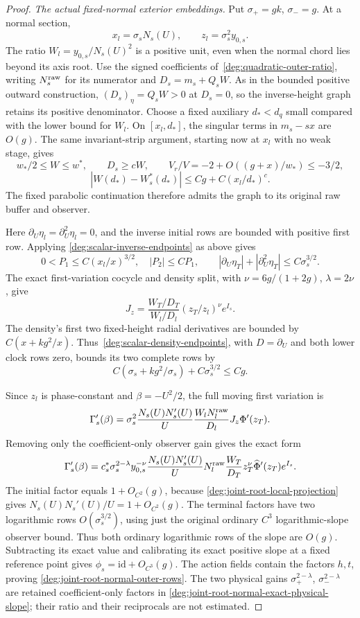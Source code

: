 \begin{proof}
\emph{The actual fixed-normal exterior embeddings.}
Put \(\sigma_+=gk\), \(\sigma_-=g\). At a normal section,
\[
 x_l=\sigma_sN_s(U),\qquad z_l=\sigma_s^2y_{0,s}.
\]
The ratio \(W_l=y_{0,s}/N_s(U)^2\) is a positive unit, even
when the normal chord lies beyond its axis root.
Use the signed coefficients of~\eqref{deg:quadratic-outer-ratio},
writing \(N_s^{\rm raw}\) for its numerator and \(D_s=m_s+Q_sW\).
As in the bounded positive outward construction,
\((D_s)_\eta=Q_sW>0\) at \(D_s=0\), so the inverse-height
graph retains its positive denominator.
Choose a fixed auxiliary \(d_*<d_q\) small compared with the lower
bound for \(W_l\). On \([x_l,d_*]\), the singular terms in
\(m_s-sx\) are \(O(g)\). The same invariant-strip argument, starting
now at \(x_l\) with no weak stage, gives
\[
 w_*/2\le W\le w^*,\qquad D_s\ge cW,\qquad
 V_r/V=-2+O((g+x)/w_*)\le-3/2,
\]
\[
 |W(d_*)-W_s^*(d_*)|\le Cg+C(x_l/d_*)^c .
\]
The fixed parabolic continuation therefore admits the graph to its
original raw buffer and observer.

Here \(\partial_U\eta_l=\partial_U^2\eta_l=0\), and the inverse
initial rows are bounded with positive first row. Applying
\eqref{deg:scalar-inverse-endpoints} as above gives
\[
 0<P_1\le C(x_l/x)^{3/2},\quad |P_2|\le CP_1,\qquad
 |\partial_U\eta_T|+|\partial_U^2\eta_T|\le C\sigma_s^{3/2}.
\]
The exact first-variation cocycle and density split, with
\(\nu=6g/(1+2g)\), \(\lambda=2\nu\), give
\[
 J_z=\frac{W_T/D_T}{W_l/D_l}(z_T/z_l)^\nu e^{I_s}.
\]
The density's first two fixed-height radial derivatives are bounded
by \(C(x+kg^2/x)\). Thus~\eqref{deg:scalar-density-endpoints},
with \(D=\partial_U\) and both lower clock rows zero, bounds its two
complete rows by
\[
 C(\sigma_s+kg^2/\sigma_s)+C\sigma_s^{3/2}\le Cg.
\]

Since \(z_l\) is phase-constant and \(\beta=-U^2/2\), the full
moving first variation is
\[
 \Gamma_s'(\beta)=
 \sigma_s^2\frac{N_s(U)N_s'(U)}U
 \frac{W_lN_l^{\rm raw}}{D_l}J_z\Phi'(z_T).
\]
Removing only the coefficient-only observer gain gives the exact
form
\begin{equation}
 \Gamma_s'(\beta)=
 c_s^\ast\sigma_s^{2-\lambda}y_{0,s}^{-\nu}
 \frac{N_s(U)N_s'(U)}U N_l^{\rm raw}
 \frac{W_T}{D_T}z_T^\nu\widehat\Phi'(z_T)e^{I_s}.
 \label{deg:joint-root-normal-exact-physical-slope}
\end{equation}
The initial factor equals \(1+O_{C^2}(g)\), because
\eqref{deg:joint-root-local-projection} gives
\(N_s(U)N_s'(U)/U=1+O_{C^2}(g)\).
The terminal factors have two logarithmic rows
\(O(\sigma_s^{3/2})\), using just the original ordinary \(C^3\)
logarithmic-slope observer bound. Thus both ordinary logarithmic
rows of the slope are \(O(g)\).
Subtracting its exact value and calibrating its exact positive
slope at a fixed reference point gives
\(\phi_s=\mathrm{id}+O_{C^3}(g)\).
The action fields contain the factors \(h,t\), proving
\eqref{deg:joint-root-normal-outer-rows}.
The two physical gains
\(\sigma_+^{2-\lambda}\), \(\sigma_-^{2-\lambda}\) are retained
coefficient-only factors in
\eqref{deg:joint-root-normal-exact-physical-slope}; their ratio
and their reciprocals are not estimated.


\end{proof}
